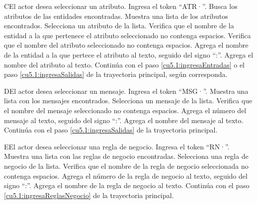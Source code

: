  \begin{UCtrayectoriaA}{C}{El actor desea seleccionar un atributo.}
 	\UCpaso[\UCactor] Ingresa el token ``ATR·''.
  	\UCpaso[\UCsist] Busca los atributos de las entidades encontradas.
  	\UCpaso[\UCsist] Muestra una lista de los atributos encontrados.
 	\UCpaso[\UCactor] Selecciona un atributo de la lista.
  	\UCpaso[\UCsist] Verifica que el nombre de la entidad a la que pertenece el atributo seleccionado no contenga espacios. 
  	\UCpaso[\UCsist] Verifica que el nombre del atributo seleccionado no contenga espacios. 
  	\UCpaso[\UCsist] Agrega el nombre de la entidad a la que pertece el atributo al texto, seguido del signo ``:''.
  	\UCpaso[\UCsist] Agrega el nombre del atributo al texto.
    \UCpaso[] Continúa con el paso \ref{cu5.1:ingresaEntradas} o el paso \ref{cu5.1:ingresaSalidas} de la trayectoria principal, según corresponda.
 \end{UCtrayectoriaA}
 \begin{UCtrayectoriaA}{D}{El actor desea seleccionar un mensaje.}
 	 \UCpaso[\UCactor] Ingresa el token ``MSG·''.	
 	\UCpaso[\UCsist] Muestra una lista con los mensajes encontrados.
 	\UCpaso[\UCactor] Selecciona un mensaje de la lista.
  	\UCpaso[\UCsist] Verifica que el nombre del mensaje seleccionado no contenga espacios. 
  	\UCpaso[\UCsist] Agrega el número del mensaje al texto, seguido del signo ``:''.
  	\UCpaso[\UCsist] Agrega el nombre del mensaje al texto.
    \UCpaso[] Continúa con el paso \ref{cu5.1:ingresaSalidas} de la trayectoria principal.
 \end{UCtrayectoriaA}
 \begin{UCtrayectoriaA}{E}{El actor desea seleccionar una regla de negocio.}
 	\UCpaso[\UCactor] Ingresa el token ``RN·''.	
 	\UCpaso[\UCsist] Muestra una lista con las reglas de negocio encontradas.
 	\UCpaso[\UCactor] Selecciona una regla de negocio de la lista.
  	\UCpaso[\UCsist] Verifica que el nombre de la regla de negocio seleccionada no contenga espacios. 
  	\UCpaso[\UCsist] Agrega el número de la regla de negocio al texto, seguido del signo ``:''.
  	\UCpaso[\UCsist] Agrega el nombre de la regla de negocio al texto.
    \UCpaso[] Continúa con el paso \ref{cu5.1:ingresaReglasNegocio} de la trayectoria principal.
 \end{UCtrayectoriaA}

